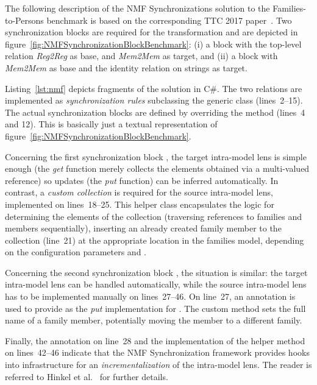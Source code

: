 The following description of the NMF Synchronizations solution to the Families-to-Persons benchmark is based on the corresponding TTC 2017 paper~\cite{Hinkel2017}.
Two synchronization blocks are required for the transformation and are depicted in figure~\ref{fig:NMFSynchronizationBlockBenchmark}:  (i) a block with the top-level relation \emph{Reg2Reg} as base, and \emph{Mem2Mem} as target, and (ii) a block with \emph{Mem2Mem} as base and the identity relation on strings as target.

Listing~\ref{lst:nmf} depicts fragments of the solution in C\#.
The two relations are implemented as \emph{synchronization rules} subclassing the generic class  (lines~2--15).
The actual synchronization blocks are defined by overriding the method  (lines~4 and 12).
This is basically just a textual representation of figure~\ref{fig:NMFSynchronizationBlockBenchmark}.

Concerning the first synchronization block , the target intra-model lens  is simple enough (the \emph{get} function merely collects the elements obtained via a multi-valued reference) so updates (the \emph{put} function) can be inferred automatically.  
In contrast, a \emph{custom collection}  is required for the source intra-model lens, implemented on lines~18--25.
This helper class encapsulates the logic for determining the elements of the collection (traversing references to families and members sequentially), inserting an already created family member to the collection (line~21) at the appropriate location in the families model, depending on the configuration parameters  and . 

Concerning the second synchronization block , the situation is similar:  the target intra-model lens  can be handled automatically, while the source intra-model lens  has to be implemented manually on lines~27--46.
On line~27, an  annotation is used to provide  as the \emph{put} implementation for .
The custom method  sets the full name of a family member, potentially moving the member to a different family.

Finally, the annotation on line~28 and the implementation of the helper method  on lines~42--46 indicate that the NMF Synchronization framework provides hooks into infrastructure for an \emph{incrementalization} of the intra-model lens.
The reader is referred to Hinkel et al.~\cite{SoSyM2017-Hinkel} for further details.

